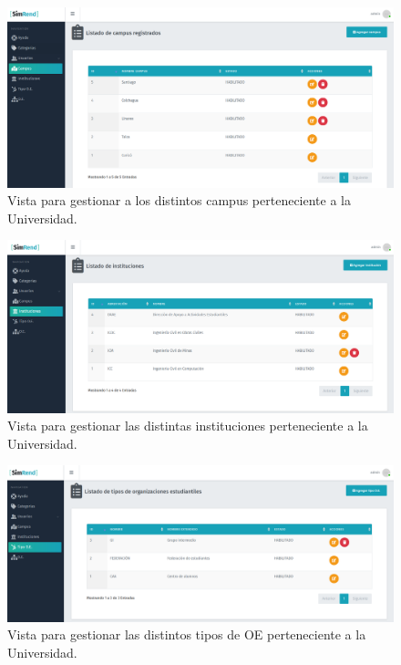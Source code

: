 \begin{figure}[h]
    \centering
    \includegraphics[width=1\textwidth]{Imagenes/CRUDCampus.PNG}
    \caption{\label{fig: CRUDCampus}Vista para gestionar a los distintos campus perteneciente a la Universidad.}
\end{figure}

\begin{figure}[h]
    \centering
    \includegraphics[width=1\textwidth]{Imagenes/CRUDInstituciones.PNG}
    \caption{\label{fig: CRUDInstituciones}Vista para gestionar las distintas instituciones perteneciente a la Universidad.}
\end{figure}

\begin{figure}[h]
    \centering
    \includegraphics[width=1\textwidth]{Imagenes/CRUDTipoOE.PNG}
    \caption{\label{fig: CRUDTipoOE}Vista para gestionar las distintos tipos de OE perteneciente a la Universidad.}
\end{figure}

